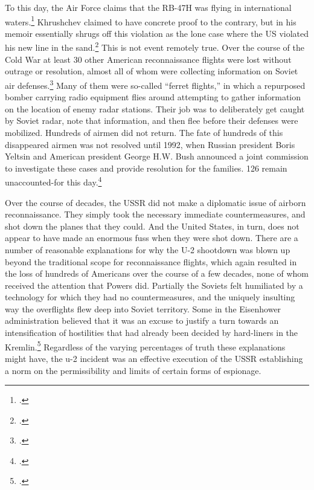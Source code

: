 \documentclass[12pt]{article}
\begin{document}
To this day, the Air Force claims that the RB-47H was flying in international waters.\footcite{us_air_force_rb-47h_2015} Khrushchev claimed to have concrete proof to the contrary, but in his memoir essentially shrugs off this violation as the lone case where the US violated his new line in the sand.\footcite[p.~448]{khrushchev_khrushchev_1974} This is not event remotely true. Over the course of the Cold War at least 30 other American reconnaissance flights were lost without outrage or resolution, almost all of whom were collecting information on Soviet air defenses.\footcite{glenshaw_secret_2017} Many of them were so-called ``ferret flights,'' in which a repurposed bomber carrying radio equipment flies around attempting to gather information on the location of enemy radar stations. Their job was to deliberately get caught by Soviet radar, note that information, and then flee before their defenses were mobilized. Hundreds of airmen did not return. The fate of hundreds of this disappeared airmen was not resolved until 1992, when Russian president Boris Yeltsin and American president George H.W. Bush announced a joint commission to investigate these cases and provide resolution for the families. 126 remain unaccounted-for this day.\footcite{glenshaw_secret_2017}

Over the course of decades, the USSR did not make a diplomatic issue of airborn reconnaissance. They simply took the necessary immediate countermeasures, and shot down the planes that they could. And the United States, in turn, does not appear to have made an enormous fuss when they were shot down. There are a number of reasonable explanations for why the U-2 shootdown was blown up beyond the traditional scope for reconnaissance flights, which again resulted in the loss of hundreds of Americans over the course of a few decades, none of whom received the attention that Powers did. Partially the Soviets felt humiliated by a technology for which they had no countermeasures, and the uniquely insulting way the overflights flew deep into Soviet territory. Some in the Eisenhower administration believed that it was an excuse to justify a turn towards an intensification of hostilities that had already been decided by hard-liners in the Kremlin.\footcite[p.~328]{kistiakowsky_scientist_1976} Regardless of the varying percentages of truth these explanations might have, the u-2 incident was an effective execution of the USSR establishing a norm on the permissibility and limits of certain forms of espionage.
\end{document}
